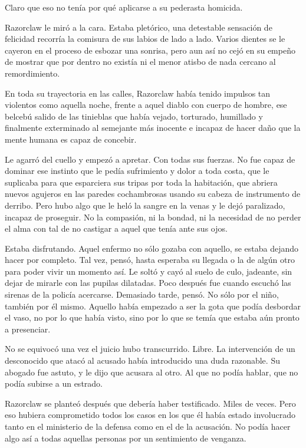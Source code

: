 Claro que eso no tenía por qué aplicarse a su pederasta homicida.

Razorclaw le miró a la cara. Estaba pletórico, una detestable sensación de felicidad recorría la comisura de sus labios de lado a lado. Varios dientes se le cayeron en el proceso de esbozar una sonrisa, pero aun así no cejó en su empeño de mostrar que por dentro no existía ni el menor atisbo de nada cercano al remordimiento.

En toda su trayectoria en las calles, Razorclaw había tenido impulsos tan violentos como aquella noche, frente a aquel diablo con cuerpo de hombre, ese belcebú salido de las tinieblas que había vejado, torturado, humillado y finalmente exterminado al semejante más inocente e incapaz de hacer daño que la mente humana es capaz de concebir.

Le agarró del cuello y empezó a apretar. Con todas sus fuerzas. No fue capaz de dominar ese instinto que le pedía sufrimiento y dolor a toda costa, que le suplicaba para que esparciera sus tripas por toda la habitación, que abriera nuevos agujeros en las paredes cochambrosas usando su cabeza de instrumento de derribo. Pero hubo algo que le heló la sangre en la venas y le dejó paralizado, incapaz de proseguir. No la compasión, ni la bondad, ni la necesidad de no perder el alma con tal de no castigar a aquel que tenía ante sus ojos.

Estaba disfrutando. Aquel enfermo no sólo gozaba con aquello, se estaba dejando hacer por completo. Tal vez, pensó, hasta esperaba su llegada o la de algún otro para poder vivir un momento así. Le soltó y cayó al suelo de culo, jadeante, sin dejar de mirarle con las pupilas dilatadas. Poco después fue cuando escuchó las sirenas de la policía acercarse. Demasiado tarde, pensó. No sólo por el niño, también por él mismo. Aquello había empezado a ser la gota que podía desbordar el vaso, no por lo que había visto, sino por lo que se temía que estaba aún pronto a presenciar.

No se equivocó una vez el juicio hubo transcurrido. Libre. La intervención de un desconocido que atacó al acusado había introducido una duda razonable. Su abogado fue astuto, y le dijo que acusara al otro. Al que no podía hablar, que no podía subirse a un estrado.

Razorclaw se planteó después que debería haber testificado. Miles de veces. Pero eso hubiera comprometido todos los casos en los que él había estado involucrado tanto en el ministerio de la defensa como en el de la acusación. No podía hacer algo así a todas aquellas personas por un sentimiento de venganza.

